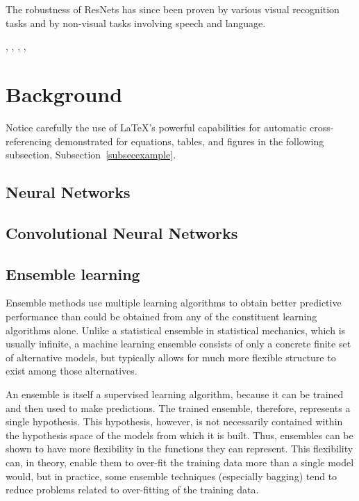 \documentclass[12pt]{article}
\numberwithin{equation}{section}
\numberwithin{table}{section}
\numberwithin{figure}{section}
\begin{document}
The robustness of ResNets has since been proven by various visual recognition tasks and by non-visual tasks involving speech and language\cite{Michael:Online}.





\cite{He2016}, \cite{Veit2016}, \cite{Wu2017}, \cite{Xie2016} , \cite{Zagoruyko2016}

\section{Background} \label{secimport}

Notice carefully the use of \LaTeX's powerful capabilities for automatic
cross-referencing demonstrated
for equations, tables, and figures
in the following subsection,
Subsection~\ref{subsecexample}.

\subsection{Neural Networks}


\subsection{Convolutional Neural Networks}


\subsection{Ensemble learning}
Ensemble methods use multiple learning algorithms to obtain better predictive performance than could be obtained from any of the constituent learning algorithms alone. Unlike a statistical ensemble in statistical mechanics, which is usually infinite, a machine learning ensemble consists of only a concrete finite set of alternative models, but typically allows for much more flexible structure to exist among those alternatives.

An ensemble is itself a supervised learning algorithm, because it can be trained and then used to make predictions. The trained ensemble, therefore, represents a single hypothesis. This hypothesis, however, is not necessarily contained within the hypothesis space of the models from which it is built. Thus, ensembles can be shown to have more flexibility in the functions they can represent. This flexibility can, in theory, enable them to over-fit the training data more than a single model would, but in practice, some ensemble techniques (especially bagging) tend to reduce problems related to over-fitting of the training data.
\end{document}
